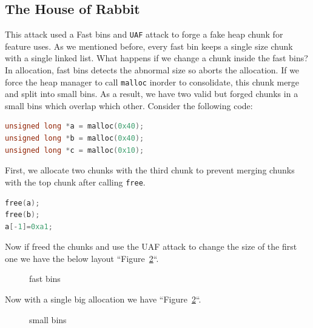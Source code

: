 \documentclass{masterthesis}
\newcommand*\fb{fast bins}
\newcommand*\sbs{small bins}
\newcommand*\Fb{Fast bins\xspace}
\newcommand*\mallocc{\lstinline{malloc}}
\newcommand*\freec{\lstinline{free}}
\begin{document}
\subsection{The House of Rabbit}

This attack used a \Fb{} and \lstinline{UAF} attack to forge a fake heap chunk for feature uses. As we mentioned before, every fast bin keeps a single size chunk with a single linked list. What happens if we change a chunk inside the \fb{}? In allocation, \fb{} detects the abnormal size so aborts the allocation. If we force the heap manager to call \mallocc{} inorder to consolidate, this chunk merge and split into \sbs{}. As a result, we have two valid but forged chunks in a \sbs{} which overlap which other. Consider the following code:

\begin{lstlisting}[language=c,frame=tlrb]
unsigned long *a = malloc(0x40);
unsigned long *b = malloc(0x40);
unsigned long *c = malloc(0x10);
\end{lstlisting}

First, we allocate two chunks with the third chunk to prevent merging chunks with the top chunk after calling \freec{}.

\begin{lstlisting}[language=c,frame=tlrb]
free(a);
free(b);
a[-1]=0xa1;
\end{lstlisting}

Now if freed the chunks and use the UAF attack to change the size of the first one we have the below layout ``Figure~\ref{fig:gdb9}``.

\begin{figure}[h!]
 \caption{\fb{}}
  \label{fig:gdb8}
\end{figure}

Now with a single big allocation we have ``Figure~\ref{fig:gdb9}``.
\begin{figure}[h!]
 \caption{\sbs{}}
  \label{fig:gdb9}
\end{figure}
\end{document}
